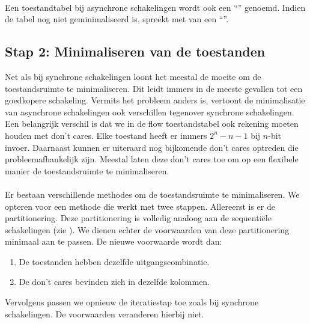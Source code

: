 \paragraph{}Een toestandtabel bij asynchrone schakelingen wordt ook een ``'' genoemd. Indien de tabel nog niet geminimaliseerd is, spreekt met van een ``''.
\subsection{Stap 2: Minimaliseren van de toestanden}
Net als bij synchrone schakelingen loont het meestal de moeite om de toestandsruimte te minimaliseren. Dit leidt immers in de meeste gevallen tot een goedkopere schakeling. Vermits het probleem anders is, vertoont de minimalisatie van asynchrone schakelingen ook verschillen tegenover synchrone schakelingen. Een belangrijk verschil is dat we in de flow toestandstabel ook rekening moeten houden met don't cares. Elke toestand heeft er immers $2^n-n-1$ bij $n$-bit invoer. Daarnaast kunnen er uiteraard nog bijkomende don't cares optreden die probleemafhankelijk zijn. Meestal laten deze don't cares toe om op een flexibele manier de toestandsruimte te minimaliseren.
\paragraph{}
Er bestaan verschillende methodes om de toestandsruimte te minimaliseren. We opteren voor een methode die werkt met twee stappen. Allereerst is er de partitionering. Deze partitionering is volledig analoog aan de sequenti\"ele schakelingen (zie ).
We dienen echter de voorwaarden van deze partitionering minimaal aan te passen. De nieuwe voorwaarde wordt dan:
\begin{enumerate}
 \item De toestanden hebben dezelfde uitgangscombinatie.
 \item De don't cares bevinden zich in dezelfde kolommen.
\end{enumerate}
Vervolgens passen we opnieuw de iteratiestap toe zoals bij synchrone schakelingen. De voorwaarden veranderen hierbij niet.

